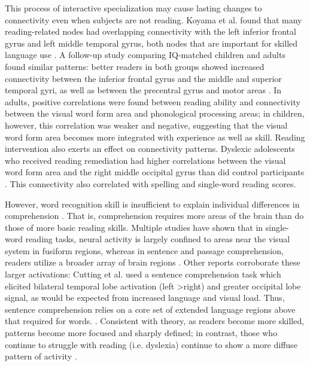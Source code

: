 This process of interactive specialization may cause lasting changes to connectivity even when subjects are not reading. Koyama et al. found that many reading-related nodes had overlapping connectivity with the left inferior frontal gyrus and left middle temporal gyrus, both nodes that are important for skilled language use \citep{Koyama2010}. A follow-up study comparing IQ-matched children and adults found similar patterns: better readers in both groups showed increased connectivity between the inferior frontal gyrus and the middle and superior temporal gyri, as well as between the precentral gyrus and motor areas \citep{Koyama2011}. In adults, positive correlations were found between reading ability and connectivity between the visual word form area and phonological processing areas; in children, however, this correlation was weaker and negative, suggesting that the visual word form area becomes more integrated with experience as well as skill. Reading intervention also exerts an effect on connectivity patterns. Dyslexic adolescents who received reading remediation had higher correlations between the visual word form area and the right middle occipital gyrus than did control participants \citep{Koyama2013}. This connectivity also correlated with spelling and single-word reading scores.

However, word recognition skill is insufficient to explain individual differences in comprehension \citep{Gough1986, Hoover1990}. That is, comprehension requires more areas of the brain than do those of more basic reading skills. Multiple studies have shown that in single-word reading tasks, neural activity is largely confined to areas near the visual system in fusiform regions, whereas in sentence and passage comprehension, readers utilize a broader array of brain regions \citep{Rimrodt2009, Xu2005}. Other reports corroborate these larger activations: Cutting et al. used a sentence comprehension task which elicited bilateral temporal lobe activation (left \textgreater right) and greater occipital lobe signal, as would be expected from increased language and visual load. Thus, sentence comprehension relies on a core set of extended language regions above that required for words.  \citep{Cutting2006a}. Consistent with theory, as readers become more skilled, patterns become more focused and sharply defined; in contrast, those who continue to struggle with reading (i.e. dyslexia) continue to show a more diffuse pattern of activity \citep{Rimrodt2009}. 

